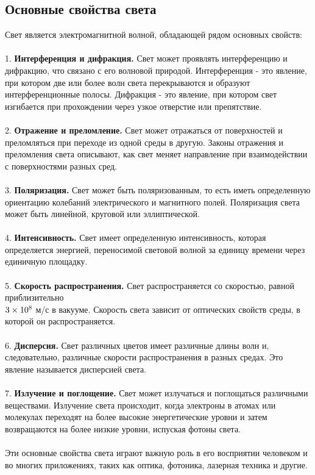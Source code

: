 \documentclass{article}
\begin{document}
\subsection{Основные свойства света}
Свет является электромагнитной волной, обладающей рядом основных свойств:\\
~\\
1. \textbf{Интерференция и дифракция.} Свет может проявлять интерференцию и дифракцию, что связано с его волновой природой. Интерференция - это явление, при котором две или более волн света перекрываются и образуют интерференционные полосы. Дифракция - это явление, при котором свет изгибается при прохождении через узкое отверстие или препятствие.\\
~\\
2. \textbf{Отражение и преломление.} Свет может отражаться от поверхностей и преломляться при переходе из одной среды в другую. Законы отражения и преломления света описывают, как свет меняет направление при взаимодействии с поверхностями разных сред.\\
~\\
3. \textbf{Поляризация.} Свет может быть поляризованным, то есть иметь определенную ориентацию колебаний электрического и магнитного полей. Поляризация света может быть линейной, круговой или эллиптической.\\
~\\
4. \textbf{Интенсивность.} Свет имеет определенную интенсивность, которая определяется энергией, переносимой световой волной за единицу времени через единичную площадку.\\
~\\
5. \textbf{Скорость распространения.} Свет распространяется со скоростью, равной приблизительно \\$3 \times 10^8\\$ м/с в вакууме. Скорость света зависит от оптических свойств среды, в которой он распространяется.\\
~\\
6. \textbf{Дисперсия.} Свет различных цветов имеет различные длины волн и, следовательно, различные скорости распространения в разных средах. Это явление называется дисперсией света.\\
~\\
7. \textbf{Излучение и поглощение.} Свет может излучаться и поглощаться различными веществами. Излучение света происходит, когда электроны в атомах или молекулах переходят на более высокие энергетические уровни и затем возвращаются на более низкие уровни, испуская фотоны света.\\
~\\
Эти основные свойства света играют важную роль в его восприятии человеком и во многих приложениях, таких как оптика, фотоника, лазерная техника и другие.
\end{document}
